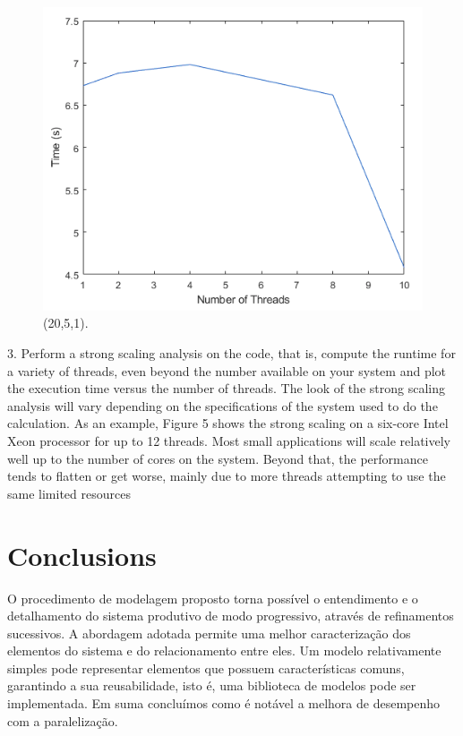 \documentclass[letterpaper, 10 pt, conference]{ieeeconf}
\begin{document}
\begin{figure}[htbp]
\centering
\includegraphics[width=0.97\columnwidth]{Figuras/img7.png}
\caption{(20,5,1).}
\label{stability}
\end{figure}
3. Perform a strong scaling analysis on the code, that is, compute the runtime for a variety of threads, even beyond the 
number available on your system and plot the execution time versus the number of threads. 
The look of the strong scaling analysis will vary depending on the specifications of the system used to do the calculation.
As an example, Figure 5 shows the strong scaling on a six-core Intel Xeon processor for up to 12 threads. Most small 
applications will scale relatively well up to the number of cores on the system. Beyond that, the performance tends to 
flatten or get worse, mainly due to more threads attempting to use the same limited resources




\section{Conclusions}
O procedimento de modelagem proposto torna possível o entendimento e o detalhamento do sistema produtivo de modo progressivo, através de refinamentos sucessivos. A abordagem adotada permite uma melhor caracterização dos elementos do sistema e do relacionamento entre eles. Um modelo relativamente simples pode representar elementos que possuem características comuns, garantindo a sua reusabilidade, isto é, uma biblioteca de modelos pode ser implementada. Em suma concluímos como é notável a melhora de desempenho com a paralelização. 
\end{document}
